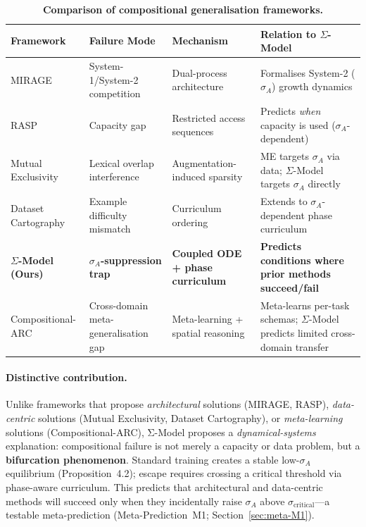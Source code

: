 \documentclass[11pt]{article}
\theoremstyle{definition}
\theoremstyle{plain}
\begin{document}
\begin{table}[htbp]
\centering
\caption{\textbf{Comparison of compositional generalisation frameworks.}}
\label{tab:framework-comparison}
\small
\begin{tabular}{>{\raggedright\arraybackslash}p{2.2cm}>{\raggedright\arraybackslash}p{2.5cm}>{\raggedright\arraybackslash}p{2.5cm}>{\raggedright\arraybackslash}p{4.8cm}}
\toprule
\textbf{Framework} & \textbf{Failure Mode} & \textbf{Mechanism} & \textbf{Relation to $\Sigma$-Model} \\
\midrule
MIRAGE \citep{noviello2025neuroscienceinspiredualprocess}
  & System-1/System-2 competition
  & Dual-process architecture
  & Formalises System-2 ($\sigma_A$) growth dynamics \\

RASP \citep{bruns2025exploringcompositionalgeneralizationin}
  & Capacity gap
  & Restricted access sequences
  & Predicts \emph{when} capacity is used ($\sigma_A$-dependent) \\

Mutual Exclusivity \citep{jiang2022mutualexclusivity}
  & Lexical overlap interference
  & Augmentation-induced sparsity
  & ME targets $\sigma_A$ via data; $\Sigma$-Model targets $\sigma_A$ directly\\

Dataset Cartography \citep{swayamdipta2020datasetcartography}
  & Example difficulty mismatch
  & Curriculum ordering
  & Extends to $\sigma_A$-dependent phase curriculum \\

\textbf{$\Sigma$-Model (Ours)}
  & \textbf{$\sigma_A$-suppression trap}
  & \textbf{Coupled ODE + phase curriculum}
  & \textbf{Predicts conditions where prior methods succeed/fail} \\

Compositional-ARC \citep{mondorf2026compositionalarc}
  & Cross-domain meta-generalisation gap
  & Meta-learning + spatial reasoning
  & Meta-learns per-task schemas; $\Sigma$-Model predicts limited cross-domain transfer \\
\bottomrule
\end{tabular}
\end{table}

\paragraph{Distinctive contribution.}
Unlike frameworks that propose \emph{architectural} solutions (MIRAGE,
RASP), \emph{data-centric} solutions (Mutual Exclusivity, Dataset
Cartography), or \emph{meta-learning} solutions (Compositional-ARC),
Σ-Model proposes a \emph{dynamical-systems} explanation:
compositional failure is not merely a capacity or data problem, but a
\textbf{bifurcation phenomenon}. Standard training creates a stable
low-$\sigma_A$ equilibrium (Proposition~4.2); escape requires crossing
a critical threshold via phase-aware curriculum. This predicts that
architectural and data-centric methods will succeed only when they
incidentally raise $\sigma_A$ above $\sigma_{\text{critical}}$---a
testable meta-prediction (Meta-Prediction~M1; Section~\ref{sec:meta-M1}).
\end{document}
